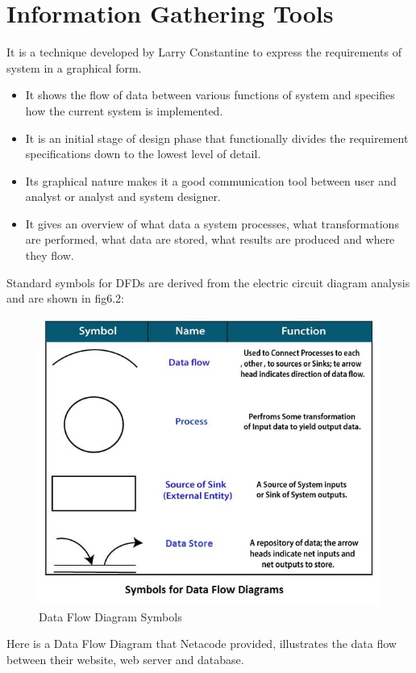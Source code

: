 \documentclass[a4paper,12pt]{report}
\begin{document}
\section{Information Gathering Tools}
It is a technique developed by Larry Constantine to express the requirements of system in a graphical form.
\begin{itemize}
	\item 	It shows the flow of data between various functions of system and specifies how the current system is implemented.
	\item 	It is an initial stage of design phase that functionally divides the requirement specifications down to the lowest level of detail.
	\item 	Its graphical nature makes it a good communication tool between user and analyst or analyst and system designer.
	\item 	It gives an overview of what data a system processes, what transformations are performed, what data are stored, what results are produced and where they flow.
	
\end{itemize}
Standard symbols for DFDs are derived from the electric circuit diagram analysis and are shown in fig6.2:
\begin{figure}[h]
	\centering
	\includegraphics[width=0.7\linewidth]{6_fig2}
	\caption{Data Flow Diagram Symbols}
	\label{fig:6fig2}
\end{figure}
\newpage
Here is a Data Flow Diagram that Netacode provided, illustrates the data flow between their website, web server and database.
\end{document}
